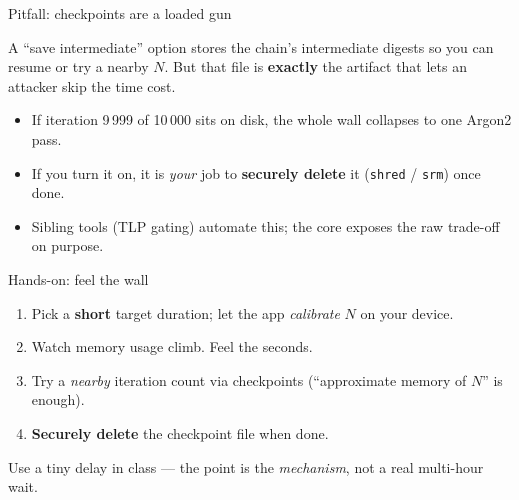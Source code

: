 \documentclass[aspectratio=169,11pt]{beamer}
\begin{document}
\begin{frame}{Pitfall: checkpoints are a loaded gun}
  \begin{pitfall}
    A ``save intermediate'' option stores the chain's intermediate digests so you
    can resume or try a nearby $N$. But that file is \textbf{exactly} the artifact
    that lets an attacker skip the time cost.
  \end{pitfall}
  \vspace{2pt}
  \begin{itemize}\small
    \item If iteration 9\,999 of 10\,000 sits on disk, the whole wall collapses to
      one Argon2 pass.
    \item If you turn it on, it is \emph{your} job to \textbf{securely delete}
      it (\texttt{shred} / \texttt{srm}) once done.
    \item Sibling tools (TLP gating) automate this; the core exposes the raw
      trade-off on purpose.
  \end{itemize}
\end{frame}

\begin{frame}{Hands-on: feel the wall}
  \begin{tryit}[In session]
    \begin{enumerate}\small
      \item Pick a \textbf{short} target duration; let the app \emph{calibrate}
        $N$ on your device.
      \item Watch memory usage climb. Feel the seconds.
      \item Try a \emph{nearby} iteration count via checkpoints (``approximate
        memory of $N$'' is enough).
      \item \textbf{Securely delete} the checkpoint file when done.
    \end{enumerate}
  \end{tryit}
  \begin{center}\footnotesize\color{graytext}
  Use a tiny delay in class --- the point is the \emph{mechanism}, not a real
  multi-hour wait.
  \end{center}
\end{frame}
\end{document}

